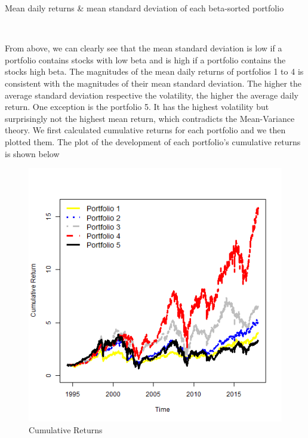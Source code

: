 \documentclass{article}
\begin{document}
\makeatletter{}\makeatother
\centering
{}
\caption{Mean daily returns \& mean standard deviation of each beta-sorted portfolio}
\label{tab:my-table}

~\\
\begin{justify}
From above, we can clearly see that the mean standard deviation is low if a portfolio contains stocks with low beta and is high if a portfolio contains the stocks high beta. The magnitudes of the mean daily returns of portfolios 1 to 4 is consistent with the magnitudes of their mean standard deviation. The higher the average standard deviation respective the volatility, the higher the average daily return. One exception is the portfolio 5. It has the highest volatility but surprisingly not the highest mean return, which contradicts the Mean-Variance theory.
We first calculated cumulative returns for each portfolio and we then plotted them. The plot of the development of each portfolio’s cumulative returns is shown below
\begin{figure}[H]
\centering
\includegraphics[width=1\textwidth,height=0.7\textwidth]{Cumulative Returns}
\caption{Cumulative Returns}
\label{fig:Cumulative Returns}
\end{figure}




\end{justify}
\end{document}
